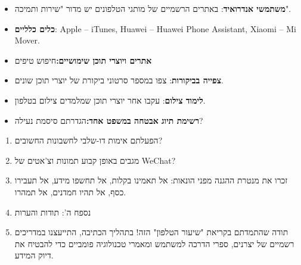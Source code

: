 

\begin{itemize}
  \item \textbf{משתמשי אנדרואיד}: באתרים הרשמיים של מותגי הטלפונים יש מדור "שירות ותמיכה".
  \item \textbf{כלים כלליים}: Apple – iTunes, Huawei – Huawei Phone Assistant, Xiaomi – Mi Mover.
  \item \textbf{אתרים ויוצרי תוכן שימושיים:}חיפוש טיפים
\end{itemize}


\begin{itemize}
  \item \textbf{צפייה בביקורות}: צפו במספר סרטוני ביקורת של יוצרי תוכן שונים.
  \item \textbf{לימוד צילום}: עקבו אחר יוצרי תוכן שמלמדים צילום בטלפון.
  \item \textbf{רשימת תיוג אבטחה במשפט אחד:}הגדרתם סיסמת נעילה?
\end{itemize}


\begin{enumerate}
  \item הפעלתם אימות דו-שלבי לחשבונות החשובים?
  \item מגבים באופן קבוע תמונות וצ'אטים של WeChat?
  \item זכרו את מנטרת ההגנה מפני הונאות: אל תאמינו בקלות, אל תחשפו מידע, אל תעבירו כסף, אל תהיו חמדנים, אל תמהרו.
  \item נספח ה': תודות והערות
  \item תודה שהתמדתם בקריאת "שיעור הטלפון" הזה! בתהליך הכתיבה, התייעצנו במדריכים רשמיים של יצרנים, ספרי הדרכה למשתמש ומאמרי טכנולוגיה פומביים כדי להבטיח את דיוק המידע.
\end{enumerate}
